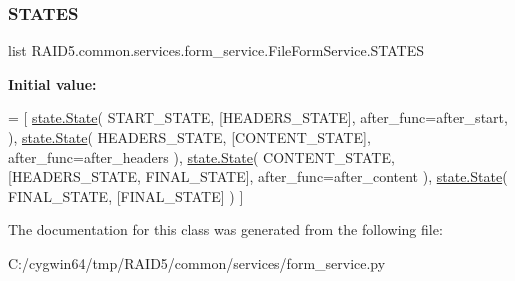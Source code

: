 \subsubsection{\texorpdfstring{S\+T\+A\+T\+ES}{STATES}}
{\footnotesize\ttfamily list R\+A\+I\+D5.\+common.\+services.\+form\+\_\+service.\+File\+Form\+Service.\+S\+T\+A\+T\+ES\hspace{0.3cm}{\ttfamily [static]}}

{\bfseries Initial value\+:}
\begin{DoxyCode}
=  [
        \hyperlink{classstate_1_1_state}{state.State}(
            START\_STATE,
            [HEADERS\_STATE],
            after\_func=after\_start,
        ),
        \hyperlink{classstate_1_1_state}{state.State}(
            HEADERS\_STATE,
            [CONTENT\_STATE],
            after\_func=after\_headers
        ),
        \hyperlink{classstate_1_1_state}{state.State}(
            CONTENT\_STATE,
            [HEADERS\_STATE, FINAL\_STATE],
            after\_func=after\_content
        ),
        \hyperlink{classstate_1_1_state}{state.State}(
            FINAL\_STATE,
            [FINAL\_STATE]
        )
    ]
\end{DoxyCode}


The documentation for this class was generated from the following file\+:\begin{DoxyCompactItemize}
\item 
C\+:/cygwin64/tmp/\+R\+A\+I\+D5/common/services/form\+\_\+service.\+py\end{DoxyCompactItemize}

